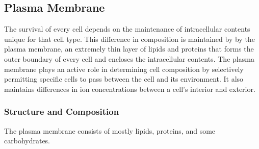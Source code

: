 \documentclass[11pt]{article}
\begin{document}
\subsection{Plasma Membrane}
The survival of every cell depends on the maintenance of intracellular contents unique for that cell type. This difference in composition is maintained by by the plasma membrane, an extremely thin layer of lipids and proteins that forms the outer boundary of every cell and encloses the intracellular contents. The plasma membrane plays an active role in determining cell composition by selectively permitting specific cells to pass between the cell and its environment. It also maintains differences in ion concentrations between a cell's interior and exterior.

\subsubsection{Structure and Composition}
The plasma membrane consists of mostly lipids, proteins, and some carbohydrates. 
\end{document}
